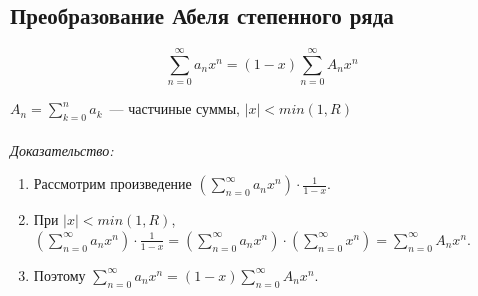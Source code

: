 \documentclass[paper=a4, fontsize=11pt]{article}
\begin{document}
\subsection{Преобразование Абеля степенного ряда}
$$\sum_{n=0}^{\infty} a_n x^n = (1-x) \sum_{n=0}^{\infty} A_n x^n$$

$A_n = \sum_{k=0}^n a_k$~--- частчиные суммы, $|x| < min(1, R)$
\\\\
\emph{Доказательство:}
\begin{enumerate}
    \item Рассмотрим произведение $(\sum_{n=0}^{\infty}a_nx^n) \cdot \frac{1}{1-x}$.
    \item При $|x| < min(1,R)$, $(\sum_{n=0}^{\infty}a_nx^n) \cdot \frac{1}{1-x} =
    (\sum_{n=0}^{\infty}a_nx^n) \cdot (\sum_{n=0}^{\infty} x^n) = \sum_{n=0}^{\infty} A_nx^n$.
    \item Поэтому $\sum_{n=0}^{\infty} a_n x^n = (1-x) \sum_{n=0}^{\infty} A_n x^n$.
\end{enumerate}
\end{document}
